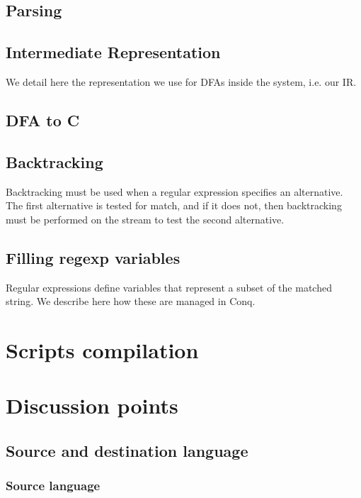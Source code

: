 \documentclass[11pt,a4paper]{report}
\begin{document}
\section{Parsing}

\section{Intermediate Representation}

We detail here the representation we use for DFAs inside the system, i.e. our IR.

\section{DFA to C}

\section{Backtracking}

Backtracking must be used when a regular expression specifies an alternative. The first alternative is tested for match, and if it does not, then backtracking must be performed on the stream to test the second alternative.

\section{Filling regexp variables}

Regular expressions define variables that represent a subset of the matched string. We describe here how these are managed in Conq.

\chapter{Scripts compilation}

\chapter{Discussion points}

\section{Source and destination language}

\subsection{Source language}
\end{document}
